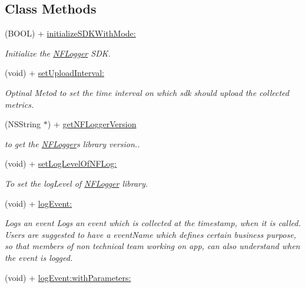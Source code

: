\subsection*{Class Methods}
\begin{DoxyCompactItemize}
\item 
(B\+O\+OL) + \hyperlink{interface_n_f_logger_a1bfc37639bda4740700d9c76027cad1f}{initialize\+S\+D\+K\+With\+Mode\+:}
\begin{DoxyCompactList}\small\item\em Initialize the \hyperlink{interface_n_f_logger}{N\+F\+Logger} S\+DK. \end{DoxyCompactList}\item 
(void) + \hyperlink{interface_n_f_logger_abab12d34a22ef54d94e9c1f32f785bbd}{set\+Upload\+Interval\+:}
\begin{DoxyCompactList}\small\item\em Optinal Metod to set the time interval on which sdk should upload the collected metrics. \end{DoxyCompactList}\item 
(N\+S\+String $\ast$) + \hyperlink{interface_n_f_logger_af6ab573a8e6498e7a50e74a022025b91}{get\+N\+F\+Logger\+Version}
\begin{DoxyCompactList}\small\item\em to get the \hyperlink{interface_n_f_logger}{N\+F\+Logger}\textquotesingle{}s library version.. \end{DoxyCompactList}\item 
(void) + \hyperlink{interface_n_f_logger_a6df3f92166f017f7574d7cf67dc6417e}{set\+Log\+Level\+Of\+N\+F\+Log\+:}
\begin{DoxyCompactList}\small\item\em To set the log\+Level of \hyperlink{interface_n_f_logger}{N\+F\+Logger} library. \end{DoxyCompactList}\item 
(void) + \hyperlink{interface_n_f_logger_a932bba0925a8ffefec035de7f3cff73a}{log\+Event\+:}
\begin{DoxyCompactList}\small\item\em Logs an event Logs an event which is collected at the timestamp, when it is called. Users are suggested to have a event\+Name which defines certain business purpose, so that members of non technical team working on app, can also understand when the event is logged. \end{DoxyCompactList}\item 
(void) + \hyperlink{interface_n_f_logger_a0135c2e9b6e8d0241bbbb3383a2ed310}{log\+Event\+:with\+Parameters\+:}

\end{DoxyCompactItemize}
